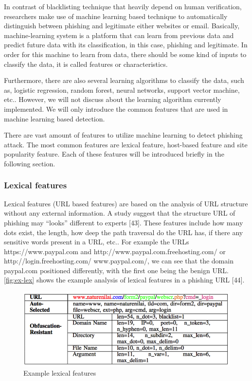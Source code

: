 In contrast of blacklisting technique that heavily depend on human
verification, researchers make use of machine learning based technique
to automatically distinguish between phishing and legitimate either
websites or email. Basically, machine-learning system is a platform
that can learn from previous data and predict future data with its
classification, in this case, phishing and legitimate. In order for
this machine to learn from data, there should be some kind of inputs
to classify the data, it is called features or characteristics. 

Furthermore, there are also several learning algorithms to classify
the data, such as, logistic regression, random forest, neural networks,
support vector machine, etc.. However, we will not discuss about the
learning algorithm currently implemented. We will only introduce the
common features that are used in machine learning based detection. 

There are vast amount of features to utilize machine learning to detect
phishing attack. The most common features are lexical feature, host-based
feature and site popularity feature. Each of these features will be
introduced briefly in the following section. 


\subsubsection{Lexical features}

Lexical features (URL based features) are based on the analysis of
URL structure without any external information. A study suggest that
the structure URL of phishing may \textquotedblleft looks\textquotedblright{}
different to experts {[}43{]}. These features include how many dots
exist, the length, how deep the path traversal do the URL has, if
there any sensitive words present in a URL, etc.. For example the
URLs https://www.paypal.com and http://www.paypal.com.freehosting.com/
or http://login.freehosting.com/ www.paypal.com/, we can see that
the domain paypal.com positioned differently, with the first one being
the benign URL. \autoref{fig:ex-lex} shows the example analysis of
lexical features in a phishing URL {[}44{]}.

\begin{figure}


\centering{}\includegraphics[scale=0.8]{gfx/lexical}\protect\caption{\label{fig:ex-lex}Example lexical features}
\end{figure}


